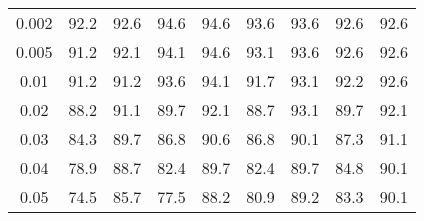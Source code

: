 \begin{table}[H]
\begin{tabular}{|c||gg|gg|gg|gg|}
    0.002 & 92.2 & 92.6 & 94.6 & 94.6 & 93.6 & 93.6 & 92.6 & 92.6 \\
    0.005 & 91.2 & 92.1 & 94.1 & 94.6 & 93.1 & 93.6 & 92.6 & 92.6 \\
    0.01 & 91.2 & 91.2 & 93.6 & 94.1 & 91.7 & 93.1 & 92.2 & 92.6 \\
    0.02 & 88.2 & 91.1 & 89.7 & 92.1 & 88.7 & 93.1 & 89.7 & 92.1 \\
    0.03 & 84.3 & 89.7 & 86.8 & 90.6 & 86.8 & 90.1 & 87.3 & 91.1 \\
    0.04 & 78.9 & 88.7 & 82.4 & 89.7 & 82.4 & 89.7 & 84.8 & 90.1 \\
    0.05 & 74.5 & 85.7 & 77.5 & 88.2 & 80.9 & 89.2 & 83.3 & 90.1 \\
    \hline
  \end{tabular}
\end{table}

